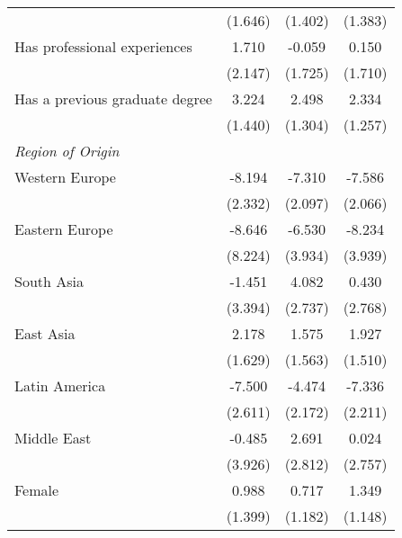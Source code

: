 \begin{table}[htbp]
{\begin{tabular}{l*{3}{c}}
                    &     (1.646)         &     (1.402)         &     (1.383)         \\
[1em]
\quad Has professional experiences&       1.710         &      -0.059         &       0.150         \\
                    &     (2.147)         &     (1.725)         &     (1.710)         \\
[1em]
\quad Has a previous graduate degree&       3.224\sym{**} &       2.498\sym{*}  &       2.334\sym{*}  \\
                    &     (1.440)         &     (1.304)         &     (1.257)         \\
\textit{Region of Origin} & & & \\
[1em]
\quad Western Europe      &      -8.194\sym{***}&      -7.310\sym{***}&      -7.586\sym{***}\\
                    &     (2.332)         &     (2.097)         &     (2.066)         \\
[1em]
\quad Eastern Europe      &      -8.646         &      -6.530\sym{*}  &      -8.234\sym{**} \\
                    &     (8.224)         &     (3.934)         &     (3.939)         \\
[1em]
\quad South Asia          &      -1.451         &       4.082         &       0.430         \\
                    &     (3.394)         &     (2.737)         &     (2.768)         \\
[1em]
\quad East Asia           &       2.178         &       1.575         &       1.927         \\
                    &     (1.629)         &     (1.563)         &     (1.510)         \\
[1em]
\quad Latin America       &      -7.500\sym{***}&      -4.474\sym{**} &      -7.336\sym{***}\\
                    &     (2.611)         &     (2.172)         &     (2.211)         \\
[1em]
\quad Middle East         &      -0.485         &       2.691         &       0.024         \\
                    &     (3.926)         &     (2.812)         &     (2.757)         \\
[1em]
Female              &       0.988         &       0.717         &       1.349         \\
                    &     (1.399)         &     (1.182)         &     (1.148)         \\

\end{tabular}}
\end{table}
